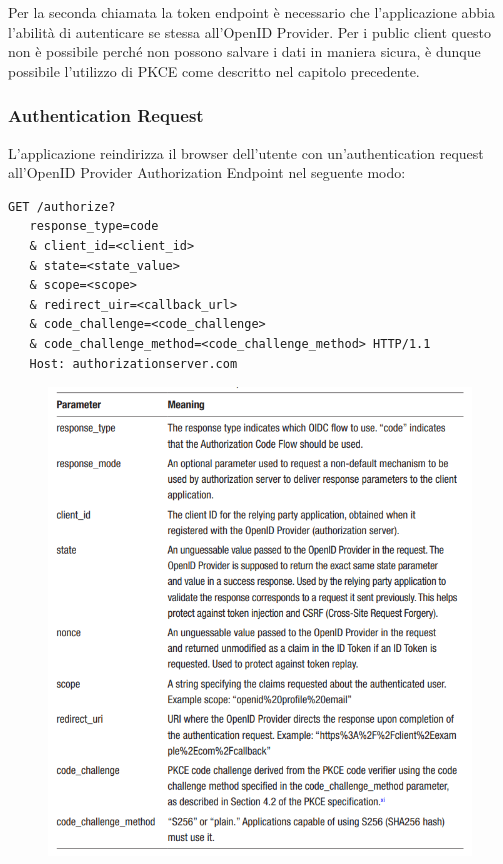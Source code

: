 Per la seconda chiamata la token endpoint è necessario che l'applicazione abbia
l'abilità di autenticare se stessa all'OpenID Provider. Per i public client questo
non è possibile perché non possono salvare i dati in maniera sicura, è dunque possibile
l'utilizzo di PKCE come descritto nel capitolo precedente.

\subsubsection{Authentication Request}

L'applicazione reindirizza il browser dell'utente con un'authentication request
all'OpenID Provider Authorization Endpoint nel seguente modo:

\begin{lstlisting}
GET /authorize?
   response_type=code
   & client_id=<client_id>
   & state=<state_value>
   & scope=<scope>
   & redirect_uir=<callback_url>
   & code_challenge=<code_challenge>
   & code_challenge_method=<code_challenge_method> HTTP/1.1
   Host: authorizationserver.com
\end{lstlisting}

\begin{figure}[H]
    \centering
    \includegraphics[width=\textwidth, keepaspectratio]{capitoli/id_managing/imgs/codeflowtab.png}
\end{figure}


